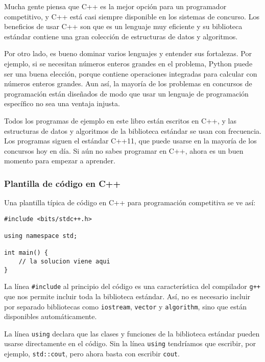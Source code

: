 Mucha gente piensa que C++ es la mejor opci\'on
para un programador competitivo,
y C++ est\'a casi siempre disponible en
los sistemas de concurso.
Los beneficios de usar C++ son que
es un lenguaje muy eficiente y
su biblioteca est\'andar contiene una
gran colecci\'on
de estructuras de datos y algoritmos.

Por otro lado, es bueno
dominar varios lenguajes y entender
sus fortalezas.
Por ejemplo, si se necesitan n\'umeros enteros grandes
en el problema,
Python puede ser una buena elecci\'on, porque
contiene operaciones integradas para
calcular con n\'umeros enteros grandes.
Aun as\'i, la mayor\'ia de los problemas en concursos de programaci\'on
est\'an diseñados de modo que
usar un lenguaje de programaci\'on espec\'ifico
no sea una ventaja injusta.

Todos los programas de ejemplo en este libro est\'an escritos en C++,
y las estructuras de datos y algoritmos de la
biblioteca est\'andar se usan con frecuencia.
Los programas siguen el est\'andar C++11,
que puede usarse en la mayor\'ia de los concursos hoy en d\'ia.
Si a\'un no sabes programar en C++,
ahora es un buen momento para empezar a aprender.

\subsubsection{Plantilla de c\'odigo en C++}

Una plantilla t\'ipica de c\'odigo en C++ para programaci\'on competitiva
se ve as\'i:

\begin{lstlisting}
#include <bits/stdc++.h>

using namespace std;

int main() {
    // la solucion viene aqui
}
\end{lstlisting}

La l\'inea \texttt{\#include} al principio
del c\'odigo es una caracter\'istica del compilador \texttt{g++}
que nos permite incluir toda la biblioteca est\'andar.
As\'i, no es necesario incluir por separado
bibliotecas como \texttt{iostream},
\texttt{vector} y \texttt{algorithm},
sino que est\'an disponibles autom\'aticamente.

La l\'inea \texttt{using} declara
que las clases y funciones
de la biblioteca est\'andar pueden usarse directamente
en el c\'odigo.
Sin la l\'inea \texttt{using} tendr\'iamos
que escribir, por ejemplo, \texttt{std::cout},
pero ahora basta con escribir \texttt{cout}.

